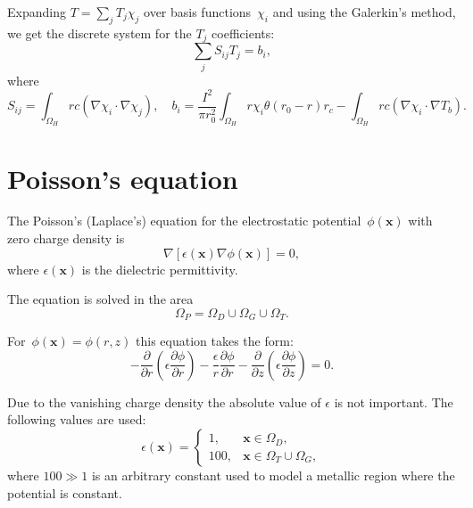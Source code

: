 \documentclass[10pt]{article}
\renewcommand{\vec}[1]{\mathbf{#1}}
\newcommand{\vx}{\vec{x}}
\begin{document}
Expanding $T = \sum_j T_j \chi_j$ over basis functions~$\chi_i$ and using
the Galerkin's method, we get the discrete system for the $T_j$ coefficients:
\begin{equation}
	\sum_j S_{ij} T_j = b_i,
\end{equation}
where
\begin{equation}
	S_{ij} = \int_{\Omega_H} r c ( \nabla\chi_i \cdot \nabla\chi_j ), \quad
	b_i = \frac{I^2}{\pi r_0^2} \int_{\Omega_H} r \chi_i \theta(r_0 - r) r_c
	- \int_{\Omega_H} r c ( \nabla\chi_i \cdot \nabla T_b ).
\end{equation}

\section{Poisson's equation}

The Poisson's (Laplace's) equation for the electrostatic potential~$\phi(\vx)$
with zero charge density is
\begin{equation}
	\nabla[ \epsilon(\vx) \nabla \phi(\vx) ] = 0,
\end{equation}
where $\epsilon(\vx)$ is the dielectric permittivity.

The equation is solved in the area
\begin{equation}
	\Omega_P = \Omega_D \cup \Omega_G \cup \Omega_T.
\end{equation}

For~$\phi(\vx) = \phi(r, z)$ this equation takes the form:
\begin{equation}
	\label{eq:poisson_equation_rz}
	- \frac{\partial}{\partial r} \left( \epsilon \frac{\partial \phi}{\partial r} \right)
	- \frac{\epsilon}{r} \frac{\partial \phi}{\partial r}
	- \frac{\partial}{\partial z} \left( \epsilon \frac{\partial \phi}{\partial z} \right)
	= 0.
\end{equation}

Due to the vanishing charge density the absolute value of $\epsilon$ is not
important. The following values are used:
\begin{equation}
	\epsilon(\vx) =
		\begin{cases}
			1, 		& \vx \in \Omega_D, \\
			100,	& \vx \in \Omega_T \cup \Omega_G,
		\end{cases}
\end{equation}
where $100 \gg 1$ is an arbitrary constant used to model a metallic region where
the potential is constant.
\end{document}
